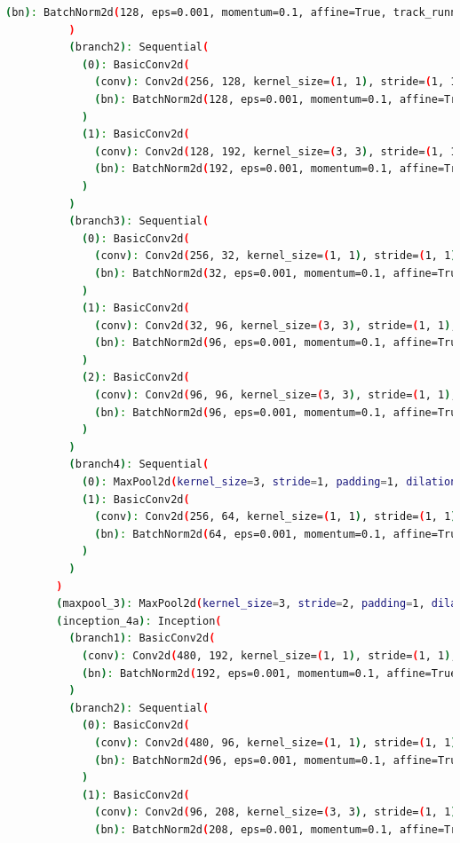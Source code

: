 \documentclass[a4paper, 12pt]{article}
\begin{document}
\begin{lstlisting}[language=sh]
            (bn): BatchNorm2d(128, eps=0.001, momentum=0.1, affine=True, track_running_stats=True)
          )
          (branch2): Sequential(
            (0): BasicConv2d(
              (conv): Conv2d(256, 128, kernel_size=(1, 1), stride=(1, 1), bias=False)
              (bn): BatchNorm2d(128, eps=0.001, momentum=0.1, affine=True, track_running_stats=True)
            )
            (1): BasicConv2d(
              (conv): Conv2d(128, 192, kernel_size=(3, 3), stride=(1, 1), padding=(1, 1), bias=False)
              (bn): BatchNorm2d(192, eps=0.001, momentum=0.1, affine=True, track_running_stats=True)
            )
          )
          (branch3): Sequential(
            (0): BasicConv2d(
              (conv): Conv2d(256, 32, kernel_size=(1, 1), stride=(1, 1), bias=False)
              (bn): BatchNorm2d(32, eps=0.001, momentum=0.1, affine=True, track_running_stats=True)
            )
            (1): BasicConv2d(
              (conv): Conv2d(32, 96, kernel_size=(3, 3), stride=(1, 1), padding=(1, 1), bias=False)
              (bn): BatchNorm2d(96, eps=0.001, momentum=0.1, affine=True, track_running_stats=True)
            )
            (2): BasicConv2d(
              (conv): Conv2d(96, 96, kernel_size=(3, 3), stride=(1, 1), padding=(1, 1), bias=False)
              (bn): BatchNorm2d(96, eps=0.001, momentum=0.1, affine=True, track_running_stats=True)
            )
          )
          (branch4): Sequential(
            (0): MaxPool2d(kernel_size=3, stride=1, padding=1, dilation=1, ceil_mode=False)
            (1): BasicConv2d(
              (conv): Conv2d(256, 64, kernel_size=(1, 1), stride=(1, 1), bias=False)
              (bn): BatchNorm2d(64, eps=0.001, momentum=0.1, affine=True, track_running_stats=True)
            )
          )
        )
        (maxpool_3): MaxPool2d(kernel_size=3, stride=2, padding=1, dilation=1, ceil_mode=False)
        (inception_4a): Inception(
          (branch1): BasicConv2d(
            (conv): Conv2d(480, 192, kernel_size=(1, 1), stride=(1, 1), bias=False)
            (bn): BatchNorm2d(192, eps=0.001, momentum=0.1, affine=True, track_running_stats=True)
          )
          (branch2): Sequential(
            (0): BasicConv2d(
              (conv): Conv2d(480, 96, kernel_size=(1, 1), stride=(1, 1), bias=False)
              (bn): BatchNorm2d(96, eps=0.001, momentum=0.1, affine=True, track_running_stats=True)
            )
            (1): BasicConv2d(
              (conv): Conv2d(96, 208, kernel_size=(3, 3), stride=(1, 1), padding=(1, 1), bias=False)
              (bn): BatchNorm2d(208, eps=0.001, momentum=0.1, affine=True, track_running_stats=True)

\end{lstlisting}
\end{document}
